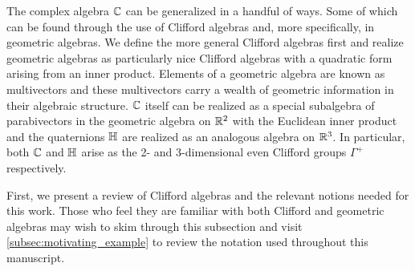 
The complex algebra $\mathbb{C}$ can be generalized in a handful of ways.  Some of which can be found through the use of Clifford algebras and, more specifically, in geometric algebras.  We define the more general Clifford algebras first and realize geometric algebras as particularly nice Clifford algebras with a quadratic form arising from an inner product. Elements of a geometric algebra are known as multivectors and these multivectors carry a wealth of geometric information in their algebraic structure. $\mathbb{C}$ itself can be realized as a special subalgebra of parabivectors in the geometric algebra on $\mathbb{R}^2$ with the Euclidean inner product and the quaternions $\mathbb{H}$ are realized as an analogous algebra on $\mathbb{R}^3$. In particular, both $\mathbb{C}$ and $\mathbb{H}$ arise as the 2- and 3-dimensional even Clifford groups $\Gamma^+$ respectively. 

First, we present a review of Clifford algebras and the relevant notions needed for this work. Those who feel they are familiar with both Clifford and geometric algebras may wish to skim through this subsection and visit \cref{subsec:motivating_example} to review the notation used throughout this manuscript. 

